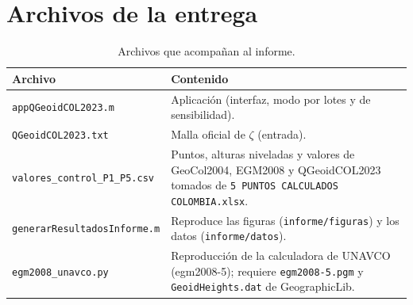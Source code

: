 \documentclass[11pt,letterpaper]{article}
\begin{document}
\section{Archivos de la entrega}
\label{anx:archivos}
\begin{table}[H]
\centering
\caption{Archivos que acompañan al informe.}
\small
\renewcommand{\arraystretch}{1.2}
\begin{tabular}{@{}p{5.6cm}p{9.8cm}@{}}
\toprule
Archivo & Contenido \\
\midrule
\texttt{appQGeoidCOL2023.m} & Aplicación (interfaz, modo por lotes y de sensibilidad). \\
\texttt{QGeoidCOL2023.txt} & Malla oficial de $\zeta$ (entrada). \\
\texttt{valores\_control\_P1\_P5.csv} & Puntos, alturas niveladas y valores de GeoCol2004, EGM2008 y QGeoidCOL2023 tomados de \texttt{5 PUNTOS CALCULADOS COLOMBIA.xlsx}. \\
\texttt{generarResultadosInforme.m} & Reproduce las figuras (\texttt{informe/figuras}) y los datos (\texttt{informe/datos}). \\
\texttt{egm2008\_unavco.py} & Reproducción de la calculadora de UNAVCO (egm2008-5); requiere \texttt{egm2008-5.pgm} y \texttt{GeoidHeights.dat} de GeographicLib. \\
\bottomrule
\end{tabular}
\end{table}
\end{document}
